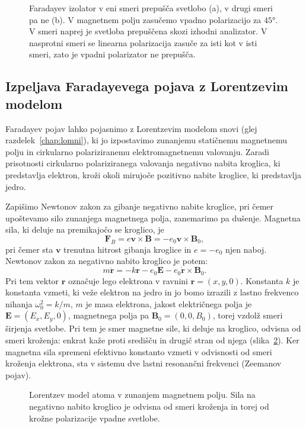 \begin{figure}[ht]
\centering
\def\svgwidth{100truemm} 

\caption{Faradayev izolator v eni smeri prepušča svetlobo (a), v drugi smeri pa ne (b).
V magnetnem polju zasučemo vpadno polarizacijo za $45\si{\degree}$. V smeri naprej je
svetloba prepuščena skozi izhodni analizator. V nasprotni smeri se linearna polarizacija
zasuče za isti kot v isti smeri, zato je vpadni polarizator ne prepušča.}
\label{fig:09_izolator}
\end{figure}

\subsection*{Izpeljava Faradayevega pojava z Lorentzevim modelom}
Faradayev pojav lahko pojasnimo z Lorentzevim modelom snovi 
(glej razdelek~\ref{chap:lomni}), ki jo izpostavimo zunanjemu 
statičnemu magnetnemu polju in cirkularno polariziranemu
elektro\-magnetnemu valovanju. Zaradi prisotnosti cirkularno 
polariziranega valovanja negativno nabita kroglica, ki predstavlja elektron, 
kroži okoli mirujoče pozitivno nabite kroglice, ki predstavlja jedro. 

Zapišimo Newtonov zakon za gibanje negativno nabite kroglice,
pri čemer upoštevamo silo zunanjega magnetnega polja, zanemarimo pa dušenje. 
Magnetna sila, ki deluje na premikajočo se kroglico, je 
\begin{equation}
\mathbf{F}_B = e \mathbf{v}\times \mathbf{B} = -e_0 \mathbf{v}\times \mathbf{B}_0,
\label{eq:09_52}
\end{equation}
pri čemer sta $\mathbf{v}$ trenutna hitrost gibanja kroglice in $e = -e_0$
njen naboj. Newtonov zakon za negativno nabito kroglico je potem:
\begin{equation}
m\ddot{\mathbf{r}} = -k \mathbf{r}-e_0 \mathbf{E} -e_0 \dot{\mathbf{r}}\times \mathbf{B}_0.
\label{eq:09_55}
\end{equation}
Pri tem vektor $\mathbf{r}$ označuje lego elektrona v ravnini $\mathbf{r} = (x,y,0)$. Konstanta
$k$ je konstanta vzmeti, ki veže elektron na jedro in  jo bomo izrazili z lastno frekvenco 
nihanja $\omega_0^2 = k/m$, $m$ je masa elektrona, jakost električnega polja je $\mathbf{E} = (E_x, E_y, 0)$,
magnetnega polja pa $\mathbf{B}_0 = (0,0,B_0)$, torej vzdolž smeri širjenja svetlobe. 
Pri tem je smer magnetne sile, ki deluje na kroglico, odvisna od smeri kroženja: 
enkrat kaže proti središču in drugič stran od njega (slika~\ref{fig:09_LorentzB}).
Ker magnetna sila spremeni
efektivno konstanto vzmeti v odvisnosti od smeri kroženja elektrona, sta v sistemu
dve lastni resonančni frekvenci (Zeemanov pojav).
\begin{figure}[ht]
\centering
\def\svgwidth{110truemm} 

\caption{Lorentzev model atoma v zunanjem magnetnem polju. Sila na negativno 
nabito kroglico je odvisna od smeri kroženja in torej od krožne polarizacije vpadne svetlobe.
}
\label{fig:09_LorentzB}
\end{figure}


